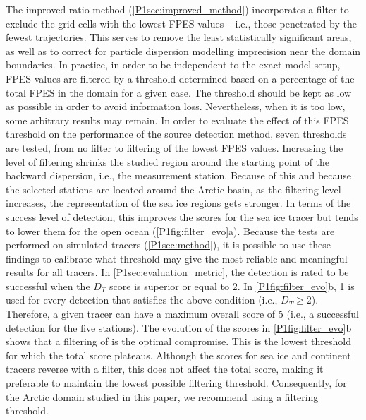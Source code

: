         The improved ratio method (\cref{P1sec:improved_method}) incorporates a filter to exclude the grid cells with the lowest FPES values -- i.e., those penetrated by the fewest trajectories. This serves to remove the least statistically significant areas, as well as to correct for particle dispersion modelling imprecision near the domain boundaries.
        In practice, in order to be independent to the exact model setup, FPES values are filtered by a threshold determined based on a percentage of the total FPES in the domain for a given case.
        The threshold should be kept as low as possible in order to avoid information loss. Nevertheless, when it is too low, some arbitrary results may remain.
        In order to evaluate the effect of this FPES threshold on the performance of the source detection method, seven thresholds are tested, from no filter to filtering  of the lowest FPES values.
        Increasing the level of filtering shrinks the studied region around the starting point of the backward dispersion, i.e., the measurement station.
        Because of this and because the selected stations are located around the Arctic basin, as the filtering level increases, the representation of the sea ice regions gets stronger.
        In terms of the success level of detection, this improves the scores for the sea ice tracer but tends to lower them for the open ocean (\cref{P1fig:filter_evo}a).
        Because the tests are performed on simulated tracers (\cref{P1sec:method}), it is possible to use these findings to calibrate what threshold may give the most reliable and meaningful results for all tracers.
        In \cref{P1sec:evaluation_metric}, the detection is rated to be successful when the $D_{T}$ score is superior or equal to 2.
        In \cref{P1fig:filter_evo}b, 1 is used for every detection that satisfies the above condition (i.e., $D_{T} \geq 2$).
        Therefore, a given tracer can have a maximum overall score of 5 (i.e., a successful detection for the five stations).
        The evolution of the scores in \cref{P1fig:filter_evo}b shows that a filtering of  is the optimal compromise.
        This is the lowest threshold for which the total score plateaus.
        Although the scores for sea ice and continent tracers reverse with a  filter, this does not affect the total score, making it preferable to maintain the lowest possible filtering threshold.
        Consequently, for the Arctic domain studied in this paper, we recommend using a  filtering threshold.

